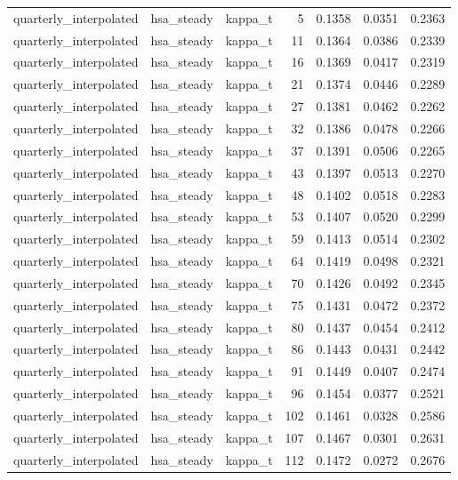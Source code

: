 \begin{tabular}{lllrrrr}
quarterly\_interpolated & hsa\_steady & kappa\_t & 5 & 0.1358 & 0.0351 & 0.2363 \\
quarterly\_interpolated & hsa\_steady & kappa\_t & 11 & 0.1364 & 0.0386 & 0.2339 \\
quarterly\_interpolated & hsa\_steady & kappa\_t & 16 & 0.1369 & 0.0417 & 0.2319 \\
quarterly\_interpolated & hsa\_steady & kappa\_t & 21 & 0.1374 & 0.0446 & 0.2289 \\
quarterly\_interpolated & hsa\_steady & kappa\_t & 27 & 0.1381 & 0.0462 & 0.2262 \\
quarterly\_interpolated & hsa\_steady & kappa\_t & 32 & 0.1386 & 0.0478 & 0.2266 \\
quarterly\_interpolated & hsa\_steady & kappa\_t & 37 & 0.1391 & 0.0506 & 0.2265 \\
quarterly\_interpolated & hsa\_steady & kappa\_t & 43 & 0.1397 & 0.0513 & 0.2270 \\
quarterly\_interpolated & hsa\_steady & kappa\_t & 48 & 0.1402 & 0.0518 & 0.2283 \\
quarterly\_interpolated & hsa\_steady & kappa\_t & 53 & 0.1407 & 0.0520 & 0.2299 \\
quarterly\_interpolated & hsa\_steady & kappa\_t & 59 & 0.1413 & 0.0514 & 0.2302 \\
quarterly\_interpolated & hsa\_steady & kappa\_t & 64 & 0.1419 & 0.0498 & 0.2321 \\
quarterly\_interpolated & hsa\_steady & kappa\_t & 70 & 0.1426 & 0.0492 & 0.2345 \\
quarterly\_interpolated & hsa\_steady & kappa\_t & 75 & 0.1431 & 0.0472 & 0.2372 \\
quarterly\_interpolated & hsa\_steady & kappa\_t & 80 & 0.1437 & 0.0454 & 0.2412 \\
quarterly\_interpolated & hsa\_steady & kappa\_t & 86 & 0.1443 & 0.0431 & 0.2442 \\
quarterly\_interpolated & hsa\_steady & kappa\_t & 91 & 0.1449 & 0.0407 & 0.2474 \\
quarterly\_interpolated & hsa\_steady & kappa\_t & 96 & 0.1454 & 0.0377 & 0.2521 \\
quarterly\_interpolated & hsa\_steady & kappa\_t & 102 & 0.1461 & 0.0328 & 0.2586 \\
quarterly\_interpolated & hsa\_steady & kappa\_t & 107 & 0.1467 & 0.0301 & 0.2631 \\
quarterly\_interpolated & hsa\_steady & kappa\_t & 112 & 0.1472 & 0.0272 & 0.2676 \\

\end{tabular}
